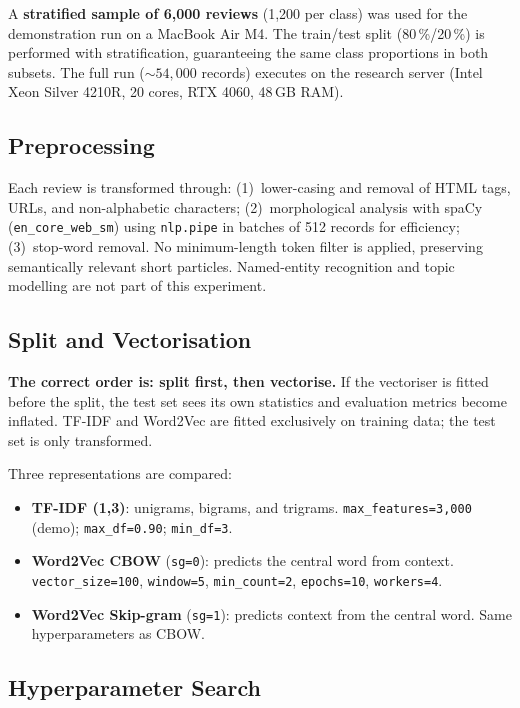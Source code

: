 \documentclass[12pt, letterpaper]{article}
\begin{document}
A \textbf{stratified sample of 6,000 reviews} (1,200 per class) was used for
the demonstration run on a MacBook Air M4. The train/test split (80\,\%/20\,\%)
is performed with stratification, guaranteeing the same class proportions in
both subsets. The full run (${\sim}54{,}000$ records) executes on the research
server (Intel Xeon Silver 4210R, 20 cores, RTX 4060, 48\,GB RAM).

\subsection{Preprocessing}

Each review is transformed through: (1)~lower-casing and removal of HTML
tags, URLs, and non-alphabetic characters; (2)~morphological analysis with
spaCy (\texttt{en\_core\_web\_sm}) using \texttt{nlp.pipe} in batches of 512
records for efficiency; (3)~stop-word removal. No minimum-length token filter
is applied, preserving semantically relevant short particles. Named-entity
recognition and topic modelling are not part of this experiment.

\subsection{Split and Vectorisation}

\textbf{The correct order is: split first, then vectorise.} If the vectoriser
is fitted before the split, the test set sees its own statistics and evaluation
metrics become inflated. TF-IDF and Word2Vec are fitted exclusively on
training data; the test set is only transformed.

Three representations are compared:

\begin{itemize}
  \item \textbf{TF-IDF (1,3)}: unigrams, bigrams, and trigrams.
    \texttt{max\_features=3,000} (demo); \texttt{max\_df=0.90};
    \texttt{min\_df=3}.
  \item \textbf{Word2Vec CBOW} (\texttt{sg=0}): predicts the central word
    from context. \texttt{vector\_size=100}, \texttt{window=5},
    \texttt{min\_count=2}, \texttt{epochs=10}, \texttt{workers=4}.
  \item \textbf{Word2Vec Skip-gram} (\texttt{sg=1}): predicts context from
    the central word. Same hyperparameters as CBOW.
\end{itemize}

\subsection{Hyperparameter Search}
\end{document}
